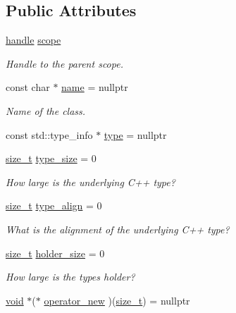 \subsection*{Public Attributes}
\begin{DoxyCompactItemize}
\item 
\mbox{\hyperlink{classhandle}{handle}} \mbox{\hyperlink{structtype__record_ab188820ddf461b3b49818f34885c5687}{scope}}
\begin{DoxyCompactList}\small\item\em Handle to the parent scope. \end{DoxyCompactList}\item 
const char $\ast$ \mbox{\hyperlink{structtype__record_aaf93cf029bb1a9686fd5e72c16ea81a8}{name}} = nullptr
\begin{DoxyCompactList}\small\item\em Name of the class. \end{DoxyCompactList}\item 
const std\+::type\+\_\+info $\ast$ \mbox{\hyperlink{structtype__record_a9b25042abe2522e477656878280c5368}{type}} = nullptr
\item 
\mbox{\hyperlink{detail_2common_8h_a801d6a451a01953ef8cbae6feb6a3638}{size\+\_\+t}} \mbox{\hyperlink{structtype__record_aa49cb21026b070945a61a29f081a2442}{type\+\_\+size}} = 0
\begin{DoxyCompactList}\small\item\em How large is the underlying C++ type? \end{DoxyCompactList}\item 
\mbox{\hyperlink{detail_2common_8h_a801d6a451a01953ef8cbae6feb6a3638}{size\+\_\+t}} \mbox{\hyperlink{structtype__record_acfe9a04defba752df8501040167c4382}{type\+\_\+align}} = 0
\begin{DoxyCompactList}\small\item\em What is the alignment of the underlying C++ type? \end{DoxyCompactList}\item 
\mbox{\hyperlink{detail_2common_8h_a801d6a451a01953ef8cbae6feb6a3638}{size\+\_\+t}} \mbox{\hyperlink{structtype__record_a5d94102cfaacdfcf2de248e00fe1afcd}{holder\+\_\+size}} = 0
\begin{DoxyCompactList}\small\item\em How large is the type\textquotesingle{}s holder? \end{DoxyCompactList}\item 
\mbox{\hyperlink{_s_d_l__opengles2__gl2ext_8h_ae5d8fa23ad07c48bb609509eae494c95}{void}} $\ast$($\ast$ \mbox{\hyperlink{structtype__record_a9c77a43dea54c475eada38b5ded56a2e}{operator\+\_\+new}} )(\mbox{\hyperlink{detail_2common_8h_a801d6a451a01953ef8cbae6feb6a3638}{size\+\_\+t}}) = nullptr

\end{DoxyCompactItemize}
